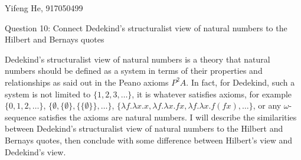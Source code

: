 \documentclass[11pt]{article}
\begin{document}
\begin{center}
    Yifeng He, 917050499
\end{center}

\begin{center}
    Question 10:
    Connect Dedekind's structuralist view of natural numbers to the Hilbert and Bernays quotes 
\end{center}

% 





Dedekind's structuralist view of natural numbers is a theory that
natural numbers should be defined as a system in terms of their properties and relationships
as said out in the Peano axioms $P^2A$.
In fact, for Dedekind, such a system is not limited to $\{1, 2, 3, \ldots\}$,
it is whatever satisfies axioms, for example
$\{0, 1, 2, \ldots\}$,
$\{ \emptyset, \{\emptyset\}, \{\{\emptyset\}\}, \ldots \}$,
$\{\lambda f. \lambda x.x, \lambda f. \lambda x.fx, \lambda f. \lambda x.f(fx), \ldots\}$,
or any $\omega$-sequence satisfies the axioms are natural numbers.
I will describe the similarities between Dedekind's structuralist view of natural numbers to the Hilbert and Bernays quotes,
then conclude with some difference between Hilbert's view and Dedekind's view.
\end{document}
